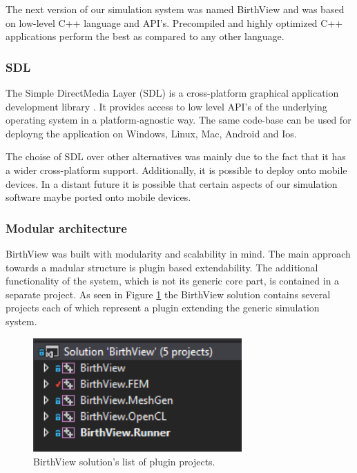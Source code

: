 The next version of our simulation system was named BirthView and was based on low-level C++ language and API's. Precompiled and highly optimized C++ applications perform the best as compared to any other language.

\subsubsection{SDL}

The Simple DirectMedia Layer (SDL) is a cross-platform graphical application development library \cite{libsdl}. It provides access to low level API's of the underlying operating system in a platform-agnostic way. The same code-base can be used for deployng the application on Windows, Linux, Mac, Android and Ios.

The choise of SDL over other alternatives was mainly due to the fact that it has a wider cross-platform support. Additionally, it is possible to deploy onto mobile devices. In a distant future it is possible that certain aspects of our simulation software maybe ported onto mobile devices.

\subsubsection{Modular architecture}

BirthView was built with modularity and scalability in mind. The main approach towards a madular structure is plugin based extendability. The additional functionality of the system, which is not its generic core part, is contained in a separate project. As seen in Figure \ref{software-birthview-projects} the BirthView solution contains several projects each of which represent a plugin extending the generic simulation system.

\begin{figure}
\begin{center}
\includegraphics[width=80mm]{sections/methodology/images/software/birthview-projects.png}
\caption[BirthView solution's list of plugin projects.]{\label{software-birthview-projects} BirthView solution's list of plugin projects.}
\end{center}
\end{figure}

